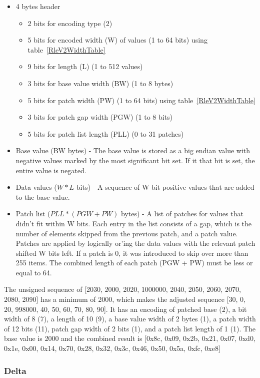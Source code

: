 \documentclass{article}
\begin{document}
\begin{itemize}
\item 4 bytes header
  \begin{itemize}
  \item 2 bits for encoding type (2)
  \item 5 bits for encoded width (W) of values (1 to 64 bits)
        using table~\ref{RleV2WidthTable}
  \item 9 bits for length (L) (1 to 512 values)
  \item 3 bits for base value width (BW) (1 to 8 bytes)
  \item 5 bits for patch width (PW) (1 to 64 bits)
        using table~\ref{RleV2WidthTable}
  \item 3 bits for patch gap width (PGW) (1 to 8 bits)
  \item 5 bits for patch list length (PLL) (0 to 31 patches)
  \end{itemize}
\item Base value (BW bytes) - The base value is stored as a big endian value
  with negative values marked by the most significant bit set. If it that
  bit is set, the entire value is negated.
\item Data values ($W * L$ bits) - A sequence of W bit positive values that
  are added to the base value.
\item Patch list ($PLL * (PGW + PW)$ bytes) - A list of patches for
  values that didn't fit within W bits. Each entry in the list
  consists of a gap, which is the number of elements skipped from the
  previous patch, and a patch value. Patches are applied by logically
  or'ing the data values with the relevant patch shifted W bits
  left. If a patch is 0, it was introduced to skip over more than 255
  items. The combined length of each patch (PGW + PW) must be less or
  equal to 64.
\end{itemize}

The unsigned sequence of [2030, 2000, 2020, 1000000, 2040, 2050, 2060,
  2070, 2080, 2090] has a minimum of 2000, which makes the adjusted
sequence [30, 0, 20, 998000, 40, 50, 60, 70, 80, 90]. It has an
encoding of patched base (2), a bit width of 8 (7), a length of 10
(9), a base value width of 2 bytes (1), a patch width of 12 bits (11),
patch gap width of 2 bits (1), and a patch list length of 1 (1). The
base value is 2000 and the combined result is [0x8c, 0x09, 0x2b, 0x21,
  0x07, 0xd0, 0x1e, 0x00, 0x14, 0x70, 0x28, 0x32, 0x3c, 0x46, 0x50,
  0x5a, 0xfc, 0xe8]

\subsubsection{Delta}
\end{document}
